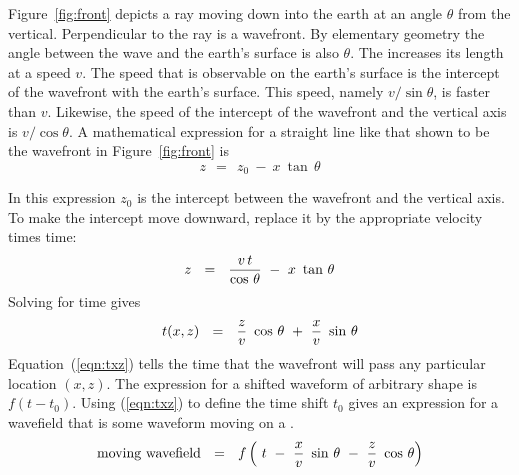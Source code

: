 Figure~\ref{fig:front} depicts a ray moving down into the earth
at an angle $ \theta $ from the vertical.
Perpendicular to the ray is a wavefront.
By elementary geometry the angle between the wave
and the earth's surface
is also  $ \theta $.
The  increases its length at a speed  $v$.
The speed that is observable on the earth's surface is the intercept
of the wavefront with the earth's surface.
This speed, namely  $ v / \sin \theta $,  is faster than  $v$.
Likewise, the speed of the intercept of the wavefront and
the vertical axis is  $ v / \cos \theta $.
A mathematical expression for a straight line
like that shown to be the wavefront in Figure~\ref{fig:front} is
\begin{equation}
z \ \ =\ \  z_0 \ -\  x \  \tan \, \theta
\label{eqn:2.1}
\end{equation}
\par
In this expression  $ z_0 $  is the intercept between the wavefront
and the vertical axis.
To make the intercept move downward, replace it by the
appropriate velocity times time:
\begin{equation}
z \ \ =\ \  {v \, t \over  \cos \, \theta } \ -\  x \  \tan \, \theta
\label{eqn:2.2}
\end{equation}
Solving for time gives
\begin{equation}
t(x,z) \ \ =\ \  {z\over v }\ \cos\,\theta \ +\  {x \over v }\  \sin \, \theta
\label{eqn:txz}
\end{equation}
Equation~(\ref{eqn:txz}) tells the time that the wavefront will pass any
particular location  $(x , z)$.
The expression for a shifted waveform
of arbitrary shape is  $ f(t - t_0 ) $.
Using (\ref{eqn:txz}) to define the time shift $ t_0 $ gives an expression for
a wavefield that is some waveform moving on a .
\begin{equation}
\hbox{moving wavefield} \ \ =\ \ 
f\left( \ t\ -\  {x \over v}\ \sin\,\theta \ -\ {z\over v}\ \cos\,\theta\right)
\label{eqn:mvwv}
\end{equation}

